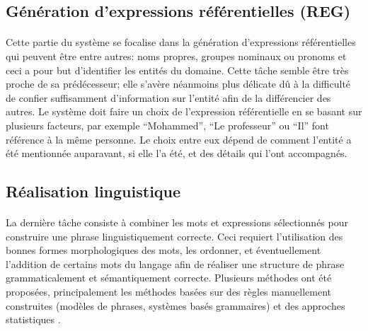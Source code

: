 	\subsection{Génération d’expressions référentielles (REG)}
	\paragraph{}Cette partie du système se focalise dans la génération d’expressions référentielles qui peuvent être entre autres: noms propres, groupes nominaux ou pronoms et ceci a pour but d’identifier les entités du domaine. Cette tâche semble être très proche de sa prédécesseur; elle s’avère néanmoins plus délicate dû à la difficulté de confier suffisamment d’information sur l’entité afin de la différencier des autres\cite{Reiter:1997}. Le système doit faire un choix de l’expression référentielle en se basant sur plusieurs facteurs, par exemple “Mohammed”, “Le professeur” ou “Il” font référence à la même personne. Le choix entre eux dépend de comment l’entité a été mentionnée auparavant, si elle l'a été, et des détails qui l'ont accompagnés. 
	
	\subsection{Réalisation linguistique}
	\paragraph{}
	La dernière tâche consiste à combiner les mots et expressions sélectionnés pour construire une phrase linguistiquement correcte. Ceci requiert l’utilisation des bonnes formes morphologiques des mots, les ordonner, et éventuellement  l’addition de certains mots du langage afin de réaliser une structure de phrase grammaticalement et sémantiquement correcte. Plusieurs méthodes ont été proposées, principalement les méthodes basées sur des règles manuellement construites (modèles de phrases, systèmes basés grammaires) et des approches statistiques \cite{Gatt2018}.
